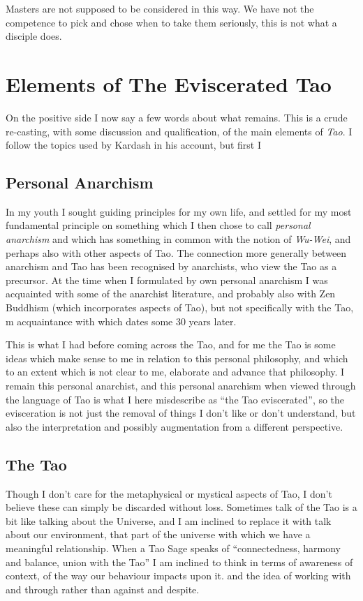 \documentclass[numreferences]{rbjk}
\begin{document}
\begin{article}
Masters are not supposed to be considered in this way.
We have not the competence to pick and chose when to take them seriously, this is not what a disciple does. 

\section{Elements of The Eviscerated Tao}

On the positive side I now say a few words about what remains.
This is a crude re-casting, with some discussion and qualification, of the main elements of {\it Tao}.
I follow the topics used by Kardash in his account, but first I 

\subsection{Personal Anarchism}

In my youth I sought guiding principles for my own life, and settled for my most fundamental principle on something which I then chose to call {\it personal anarchism} and which has something in common with the notion of {\it Wu-Wei}, and perhaps also with other aspects of Tao.
The connection more generally between anarchism and Tao has been recognised by anarchists, who view the Tao as a precursor.
At the time when I formulated by own personal anarchism I was acquainted with some of the anarchist literature, and probably also with Zen Buddhism (which incorporates aspects of Tao), but not specifically with the Tao, m acquaintance with which dates some 30 years later.

This is what I had before coming across the Tao, and for me the Tao is some ideas which make sense to me in relation to this personal philosophy, and which to an extent which is not clear to me, elaborate and advance that philosophy.
I remain this personal anarchist, and this personal anarchism when viewed through the language of Tao is what I here misdescribe as ``the Tao eviscerated'', so the evisceration is not just the removal of things I don't like or don't understand, but also the interpretation and possibly augmentation from a different perspective.

\subsection{The Tao}

Though I don't care for the metaphysical or mystical aspects of Tao, I don't believe these can simply be discarded without loss.
Sometimes talk of the Tao is a bit like talking about the Universe, and I am inclined to replace it with talk about our environment, that part of the universe with which we have a meaningful relationship.
When a Tao Sage speaks of ``connectedness, harmony and balance, union with the Tao'' I am inclined to think in terms of awareness of context, of the way our behaviour impacts upon it. and the idea of working with and through rather than against and despite.


\end{article}
\end{document}
